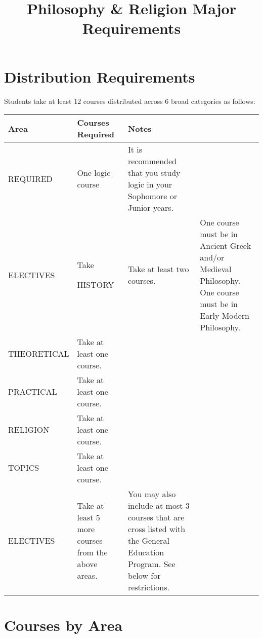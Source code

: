 \documentclass[oneside, 11pt]{article}
\renewcommand{\rmdefault}{ppl}
\renewcommand{\rmdefault}{ppl}
\begin{document}
\renewcommand*\rmdefault{ppl}\normalfont\upshape

\title{Philosophy \& Religion Major Requirements}
\maketitle
\section*{Distribution Requirements}

Students take at least 12 courses distributed across 6 broad categories as follows: 
\begin{center}
    \begin{tabular}{ | l | p{5cm}| p{5cm} |}
    \hline
     Area & Courses Required & Notes \\ \hline
REQUIRED & One logic course & It is recommended that you study logic in your Sophomore or Junior years. \\ \hline
ELECTIVES & Take 

HISTORY & Take at least two courses. & One course must be in Ancient Greek and/or Medieval Philosophy. One course must be in Early Modern Philosophy.  \\ \hline
THEORETICAL & Take at least one course. &  \\ \hline
PRACTICAL & Take at least one course. & \\ \hline
RELIGION & Take at least one course. & \\ \hline
TOPICS &  Take at least one course. & \\ \hline
ELECTIVES & Take at least 5 more courses from the above areas. & You may also include at most 3 courses that are cross listed with the General Education Program. See below for restrictions. \\ \hline
\end{tabular}
\end{center}


\section*{Courses by Area}
\end{document}
